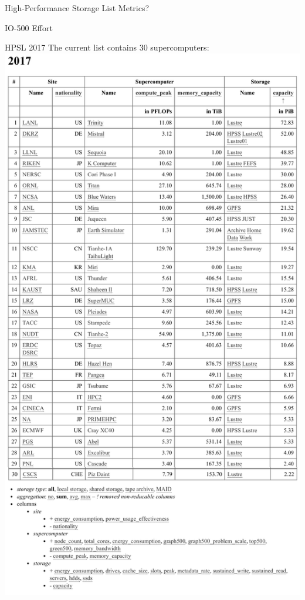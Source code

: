 \documentclass[portrait,a0paper,fontscale=0.4]{baposter}
\begin{document}
\begin{poster}
\begin{posterbox}[name=schedule,column=1,span=2, below=concept]{High-Performance Storage List}
Metrics?
\end{posterbox}

\begin{posterbox}[name=HHCC,column=1,span=2, below=schedule, above=bottom]{IO-500 Effort}
\end{posterbox}




\begin{posterbox}[name=engineering,column=3]{HPSL 2017}
The current list contains 30 supercomputers:
\includegraphics[width=\textwidth]{hpsl-current}


\end{posterbox}
\end{poster}
\end{document}
